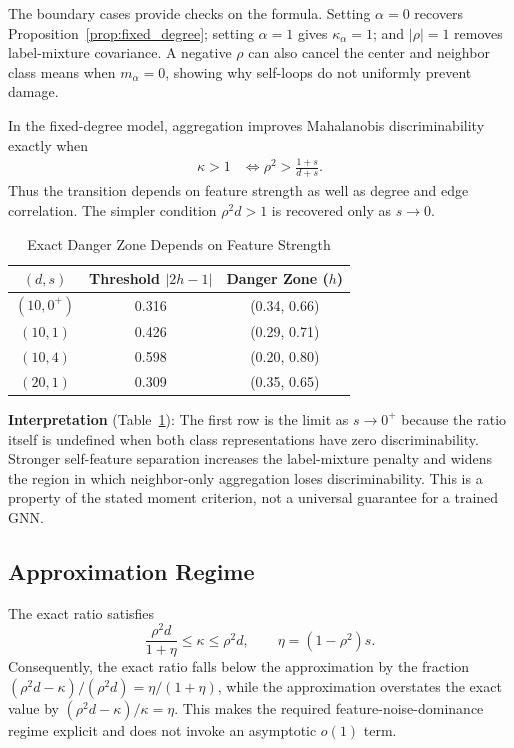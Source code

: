 The boundary cases provide checks on the formula. Setting $\alpha=0$ recovers Proposition~\ref{prop:fixed_degree}; setting $\alpha=1$ gives $\kappa_\alpha=1$; and $|\rho|=1$ removes label-mixture covariance. A negative $\rho$ can also cancel the center and neighbor class means when $m_\alpha=0$, showing why self-loops do not uniformly prevent damage.

\begin{corollary}
\label{cor:threshold}
In the fixed-degree model, aggregation improves Mahalanobis discriminability exactly when
\begin{align}
    \kappa>1
    &\iff \rho^2 > \frac{1+s}{d+s}.
\end{align}
Thus the transition depends on feature strength as well as degree and edge correlation. The simpler condition $\rho^2d>1$ is recovered only as $s\to0$.
\end{corollary}

\begin{table}[t]
\centering
\caption{Exact Danger Zone Depends on Feature Strength}
\label{tab:threshold}
\begin{tabular}{@{}ccc@{}}
\toprule
$(d,s)$ & Threshold $|2h-1|$ & Danger Zone ($h$) \\
\midrule
$(10,0^+)$ & 0.316 & (0.34, 0.66) \\
$(10,1)$ & 0.426 & (0.29, 0.71) \\
$(10,4)$ & 0.598 & (0.20, 0.80) \\
$(20,1)$ & 0.309 & (0.35, 0.65) \\
\bottomrule
\end{tabular}
\end{table}

\textbf{Interpretation} (Table~\ref{tab:threshold}): The first row is the limit as $s\to0^+$ because the ratio itself is undefined when both class representations have zero discriminability. Stronger self-feature separation increases the label-mixture penalty and widens the region in which neighbor-only aggregation loses discriminability. This is a property of the stated moment criterion, not a universal guarantee for a trained GNN.

\subsection{Approximation Regime}

The exact ratio satisfies
\begin{equation}
 \frac{\rho^2d}{1+\eta}\leq\kappa\leq\rho^2d,
 \qquad \eta=(1-\rho^2)s.
\end{equation}
Consequently, the exact ratio falls below the approximation by the fraction
$(\rho^2d-\kappa)/(\rho^2d)=\eta/(1+\eta)$, while the approximation overstates the exact value by $(\rho^2d-\kappa)/\kappa=\eta$. This makes the required feature-noise-dominance regime explicit and does not invoke an asymptotic $o(1)$ term.

